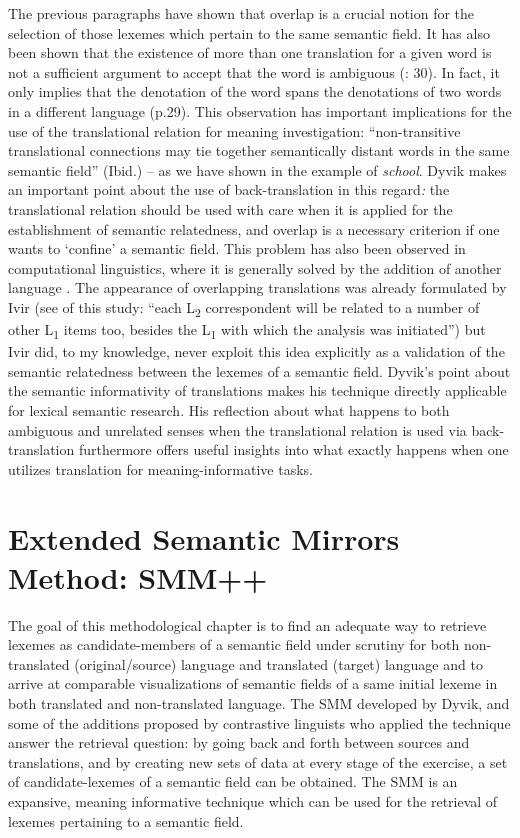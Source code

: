 The previous paragraphs have shown that overlap is a crucial notion for the selection of those lexemes which pertain to the same semantic field. It has also been shown that the existence of more than one translation for a given word is not a sufficient argument to accept that the word is ambiguous (\citealt{langemets_translations_2005}: 30). In fact, it only implies that the denotation of the word spans the denotations of two words in a different language (p.29). This observation has important implications for the use of the translational relation for meaning investigation: “non-transitive translational connections may tie together semantically distant words in the same semantic field” (Ibid.) – as we have shown in the example of \textit{school}. Dyvik makes an important point about the use of back-translation in this regard\textit{:} the translational relation should be used with care when it is applied for the establishment of semantic relatedness, and overlap is a necessary criterion if one wants to ‘confine’ a semantic field. This problem has also been observed in computational linguistics, where it is generally solved by the addition of another language \citep{gelbukh_five_2013}. The appearance of overlapping translations was already formulated by Ivir (see  of this study: “each L\textsubscript{2} correspondent will be related to a number of other L\textsubscript{1} items too, besides the L\textsubscript{1} with which the analysis was initiated”) but Ivir did, to my knowledge, never exploit this idea explicitly as a validation of the semantic relatedness between the lexemes of a semantic field. Dyvik’s point about the semantic informativity of translations makes his technique directly applicable for lexical semantic research. His reflection about what happens to both ambiguous and unrelated senses when the translational relation is used via back-translation furthermore offers useful insights into what exactly happens when one utilizes translation for meaning-informative tasks.


\section{\label{sec:3.5}  Extended Semantic Mirrors Method: SMM++}

The goal of this methodological chapter is to find an adequate way to retrieve lexemes as candidate-members of a semantic field under scrutiny for both non-translated (original/source) language and translated (target) language and to arrive at comparable visualizations of semantic fields of a same initial lexeme in both translated and non-translated language. The SMM developed by Dyvik, and some of the additions proposed by contrastive linguists who applied the technique answer the retrieval\textbf{ }question: by going back and forth between sources and translations, and by creating new sets of data at every stage of the exercise, a set of candidate-lexemes of a semantic field can be obtained. The SMM is an expansive, meaning informative technique which can be used for the retrieval of lexemes pertaining to a semantic field.



